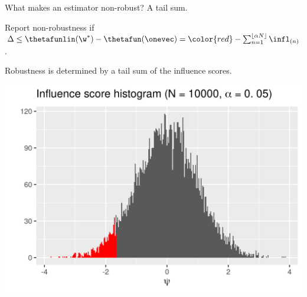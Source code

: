 
\begin{frame}{What makes an estimator non-robust?  A tail sum.}

Report non-robustness if
$ \Delta \le \thetafunlin(\w^*) - \thetafun(\onevec)  =
\color{red}- \sum_{n=1}^{\lfloor \alpha N \rfloor} \infl_{(n)}$.

\pause
Robustness is determined by a tail sum of the influence scores.

\includegraphics[width=0.9\linewidth]{static_figures/simple_infl_example.png}


\end{frame}


